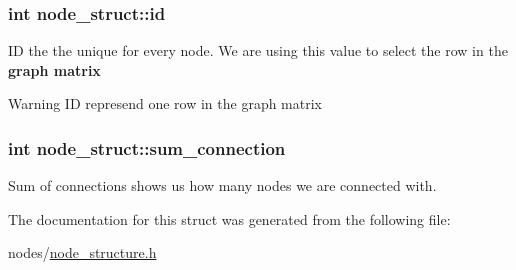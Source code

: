 \subsubsection[{\texorpdfstring{id}{id}}]{\setlength{\rightskip}{0pt plus 5cm}int node\+\_\+struct\+::id}\hypertarget{structnode__struct_aad2827c7c2c957838445ff15ccc5a7f9}{}\label{structnode__struct_aad2827c7c2c957838445ff15ccc5a7f9}
ID the the unique for every node. We are using this value to select the row in the {\bfseries graph matrix} \begin{DoxyWarning}{Warning}
ID represend one row in the graph matrix 
\end{DoxyWarning}
\subsubsection[{\texorpdfstring{sum\+\_\+connection}{sum_connection}}]{\setlength{\rightskip}{0pt plus 5cm}int node\+\_\+struct\+::sum\+\_\+connection}\hypertarget{structnode__struct_aed6e2d1b4c5803f06fce262251d5aa40}{}\label{structnode__struct_aed6e2d1b4c5803f06fce262251d5aa40}
Sum of connections shows us how many nodes we are connected with. 

The documentation for this struct was generated from the following file\+:\begin{DoxyCompactItemize}
\item 
nodes/\hyperlink{node__structure_8h}{node\+\_\+structure.\+h}\end{DoxyCompactItemize}
